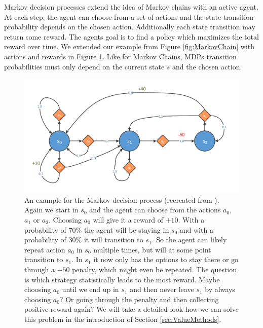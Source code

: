 Markov decision processes extend the idea of Markov chains with an active agent. At each step, the agent can choose from a set of actions and the state transition probability depends on the chosen action. Additionally each state transition may return some reward. The agents goal is to find a policy which maximizes the total reward over time. We extended our example from Figure \ref{fig:MarkovChain} with actions and rewards in Figure \ref{fig:MDP}. Like for Markov Chains, MDPs transition probabilities must only depend on the current state $s$ and the chosen action.

\begin{figure}[ht]
  
  \begin{center}
      \includegraphics[trim=10px 10px 10px 10px, clip, width=0.9\columnwidth]{figures/rl/markov_decision_process.pdf}
  \end{center}
  
  \caption[An Example for the Markov Decision Process Example]{An example for the Markov decision process (recreated from \cite{handson2019geron}). Again we start in $s_0$ and the agent can choose from the actions $a_0$, $a_1$ or $a_2$. Choosing $a_0$ will give it a reward of $+10$. With a probability of 70\% the agent will be staying in $s_0$ and with a probability of 30\% it will transition to $s_1$. So the agent can likely repeat action $a_0$ in $s_0$ multiple times, but will at some point transition to $s_1$. In $s_1$ it now only has the options to stay there or go through a $-50$ penalty, which might even be repeated. The question is which strategy statistically leads to the most reward. Maybe choosing $a_0$ until we end up in $s_1$ and then never leave $s_1$ by always choosing $a_0$? Or going through the penalty and then collecting positive reward again? We will take a detailed look how we can solve this problem in the introduction of Section \ref{sec:ValueMethods}.}
  \label{fig:MDP}
\end{figure}

